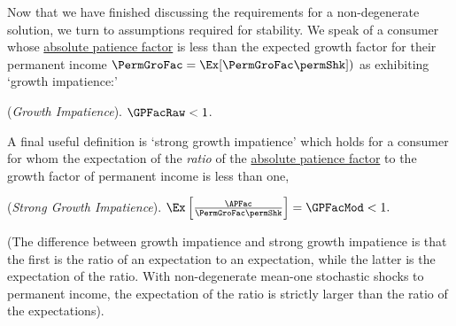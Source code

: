 \documentclass[BufferStockTheory]{subfiles}
\begin{document}
Now that we have finished discussing the requirements for a non-degenerate solution, we turn to assumptions required for stability.
We speak of a consumer whose \hyperlink{APFAC}{absolute patience factor} is less than the expected growth factor for their permanent income $\PermGroFac = \Ex[\PermGroFac \permShk])$ as exhibiting `growth impatience:' 
\hypertarget{GPFacRawDefn}{}
\hypertarget{GICRaw}{}
\begin{assumS}\label{ass:GICRaw} (\textit{Growth Impatience}).
$ \GPFacRaw  < 1$.
\end{assumS}

\begin{comment}
\begin{verbatimwrite}{Equations/GICRaw}
  \begin{equation}\begin{gathered}\begin{aligned}
        \text{\GICRaw:~~}  &&  \GPFacRaw  < 1 . \phantom{/\PermGroFac}&  \phantom{\text{\GICRaw:~~}} \label{eq:GICRaw}
      \end{aligned}\end{gathered}\end{equation}
\end{verbatimwrite}

\end{assumS}
\end{comment}

A final useful definition is `strong growth impatience' which holds for a consumer for whom the expectation of the \textit{ratio} of the \hyperlink{APFAC}{absolute patience factor} to the growth factor of permanent income is less than one, 
\hypertarget{GICMod}{}
\begin{assumS}(\textit{Strong Growth Impatience}). \label{ass:GICMod}
$ \Ex\left[\frac{\APFac}{\PermGroFac \permShk}\right] = \GPFacMod  < 1.$
\end{assumS}

(The difference between growth impatience and strong growth impatience is that the first is the ratio of an expectation to an expectation, while the latter is the expectation of the ratio.
With non-degenerate mean-one stochastic shocks to permanent income, the expectation of the ratio is strictly larger than the ratio of the expectations).

\begin{comment}
\begin{verbatimwrite}{Equations/GICMod}
  \begin{align}
    \text{{\GICMod}:~~}    \GPFacMod  & < 1 .  \phantom{\text{{\GICMod}:~~}}\label{eq:GICMod}
  \end{align}\end{verbatimwrite}

\end{comment}
\end{document}
